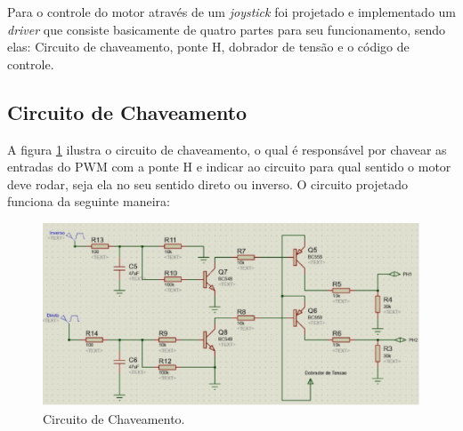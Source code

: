 Para o controle do motor através de um \textit{joystick} foi projetado e
implementado um \textit{driver} que consiste basicamente de quatro partes para
seu funcionamento, sendo elas: Circuito de chaveamento, ponte H, dobrador de
tensão e o código de controle.

\subsection{Circuito de Chaveamento}

A figura \ref{fig:chaveamento} ilustra o circuito de chaveamento, o qual é responsável por chavear as entradas do PWM com a ponte H e indicar ao circuito para qual sentido o motor deve rodar, seja ela no seu sentido direto ou inverso. O circuito projetado funciona da seguinte maneira:

\begin{figure}[h!]
  \centering
  \includegraphics[scale=0.3]{figuras/Chaveamento.jpg}
  \caption{Circuito de Chaveamento.}
    \label{fig:chaveamento}
\end{figure}

